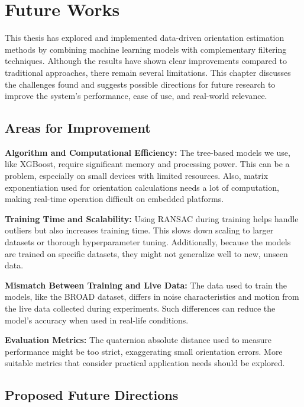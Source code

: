 \documentclass{iutbscthesis}
\begin{document}
\chapter{Future Works} \label{chapter:futureWorks}

This thesis has explored and implemented data-driven orientation estimation methods by combining machine learning models with complementary filtering techniques. Although the results have shown clear improvements compared to traditional approaches, there remain several limitations. This chapter discusses the challenges found and suggests possible directions for future research to improve the system’s performance, ease of use, and real-world relevance.

\section{Areas for Improvement}

\textbf{Algorithm and Computational Efficiency:}  
The tree-based models we use, like XGBoost, require significant memory and processing power. This can be a problem, especially on small devices with limited resources. Also, matrix exponentiation used for orientation calculations needs a lot of computation, making real-time operation difficult on embedded platforms.

\textbf{Training Time and Scalability:}  
Using RANSAC during training helps handle outliers but also increases training time. This slows down scaling to larger datasets or thorough hyperparameter tuning. Additionally, because the models are trained on specific datasets, they might not generalize well to new, unseen data.

\textbf{Mismatch Between Training and Live Data:}  
The data used to train the models, like the BROAD dataset, differs in noise characteristics and motion from the live data collected during experiments. Such differences can reduce the model’s accuracy when used in real-life conditions.

\textbf{Evaluation Metrics:}  
The quaternion absolute distance used to measure performance might be too strict, exaggerating small orientation errors. More suitable metrics that consider practical application needs should be explored.

\section{Proposed Future Directions}
\end{document}
